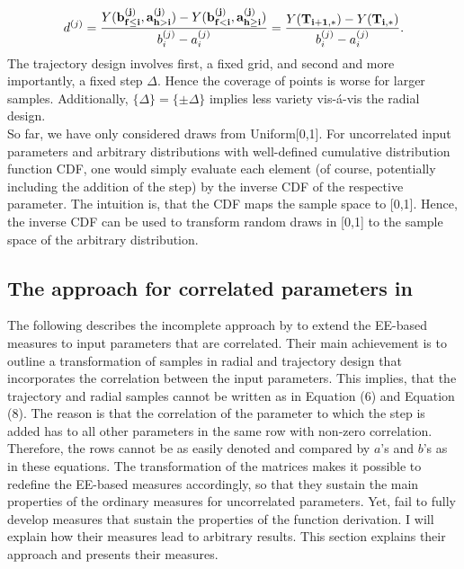 \documentclass[a4paper,12pt]{article}
\begin{document}
\begin{align}
d^{(j)} =  \frac{Y(\bold{b_{f \leq i}^{(j)}}, \bold{a_{h>i}^{(j)}}) - Y(\bold{b_{f<i}^{(j)}}, \bold{a_{h \geq i}^{(j)}})}{b_i^{(j)} - a_i^{(j)}} = \frac{Y(\bold{T_{i+1,*})} -  Y(\bold{T_{i,*}})}{b_i^{(j)} - a_i^{(j)}}.
\end{align}
The trajectory design involves first, a fixed grid, and second and more importantly, a fixed step $\Delta$. Hence the coverage of points is worse for larger samples. Additionally, $\{\Delta\} = \{\pm \Delta\}$ implies less variety vis-á-vis the radial design.\\

\noindent
So far, we have only considered draws from Uniform[0,1]. For uncorrelated input parameters and arbitrary distributions with well-defined cumulative distribution function CDF, one would simply evaluate each element (of course, potentially including the addition of the step) by the inverse CDF of the respective parameter. The intuition is, that the CDF maps the sample space to [0,1]. Hence, the inverse CDF can be used to transform random draws in [0,1] to the sample space of the arbitrary distribution.



\subsection{The approach for correlated parameters in \cite{ge2017extending}}

The following describes the incomplete approach by \cite{ge2017extending} to extend the EE-based measures to input parameters that are correlated. Their main achievement is to outline a transformation of samples in radial and trajectory design that incorporates the correlation between the input parameters. This implies, that the trajectory and radial samples cannot be written as in Equation (6) and Equation (8). The reason is that the correlation of the parameter to which the step is added has to all other parameters in the same row with non-zero correlation. Therefore, the rows cannot be as easily denoted and compared by $a$'s and $b$'s as in these equations. The transformation of the matrices makes it possible to redefine the EE-based measures accordingly, so that they sustain the main properties of the ordinary measures for uncorrelated parameters. Yet, \cite{ge2017extending} fail to fully develop measures that sustain the properties of the function derivation. I will explain how their measures lead to arbitrary results. This section explains their approach and presents their measures.












\newpage

\end{document}
